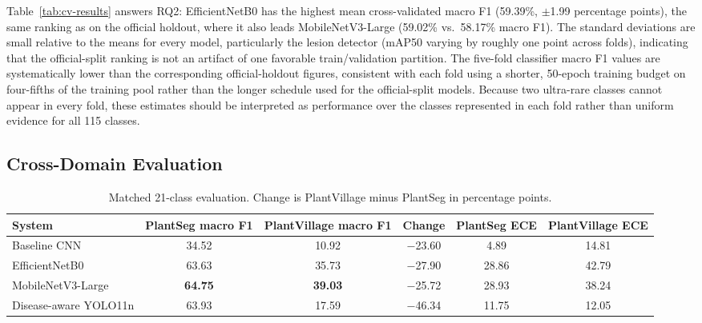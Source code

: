 \documentclass[conference]{IEEEtran}
\newcommand{\ppoints}{percentage points}
\begin{document}
Table~\ref{tab:cv-results} answers RQ2: EfficientNetB0 has the highest mean cross-validated macro
F1 (59.39\%, $\pm$1.99 \ppoints{}), the same ranking as on the official holdout, where it also leads
MobileNetV3-Large (59.02\% vs.\ 58.17\% macro F1). The standard deviations are small relative to
the means for every model, particularly the lesion detector (mAP50 varying by roughly one point
across folds), indicating that the official-split ranking is not an artifact of one favorable
train/validation partition. The five-fold classifier macro F1 values are systematically lower than
the corresponding official-holdout figures, consistent with each fold using a shorter, 50-epoch
training budget on four-fifths of the training pool rather than the longer schedule used for the
official-split models. Because two ultra-rare classes cannot appear in every fold, these estimates
should be interpreted as performance over the classes represented in each fold rather than uniform
evidence for all 115 classes.

\subsection{Cross-Domain Evaluation}

\begin{table}[t]
\caption{Matched 21-class evaluation. Change is PlantVillage minus PlantSeg in percentage points.}
\label{tab:domain-results}
\centering
\begin{tabular}{lccccc}
\toprule
System & PlantSeg macro F1 & PlantVillage macro F1 & Change & PlantSeg ECE & PlantVillage ECE \\
\midrule
Baseline CNN & 34.52 & 10.92 & $-$23.60 & 4.89 & 14.81 \\
EfficientNetB0 & 63.63 & 35.73 & $-$27.90 & 28.86 & 42.79 \\
MobileNetV3-Large & \textbf{64.75} & \textbf{39.03} & $-$25.72 & 28.93 & 38.24 \\
Disease-aware YOLO11n & 63.93 & 17.59 & $-$46.34 & 11.75 & 12.05 \\
\bottomrule
\end{tabular}
\end{table}
\end{document}
